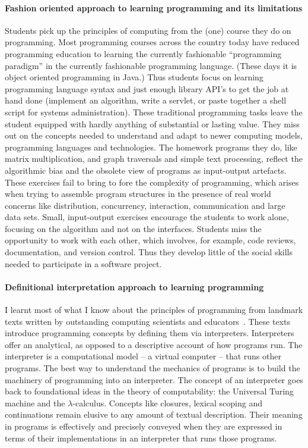 \documentclass[
9pt, 
]{article}
\begin{document}
\paragraph{Fashion oriented approach to learning programming and its limitations}
Students pick up the principles of computing from the (one)
course they do on programming.  Most programming courses
across the country today have reduced programming education
to learning the currently fashionable ``programming
paradigm'' in the currently fashionable programming language.
(These days it is object oriented programming in Java.)
Thus students focus on learning programming language syntax
and just enough library API's to get the job at hand done
(implement an algorithm, write a servlet, or paste together
a shell script for systems administration).  These
traditional programming tasks leave the student equipped
with hardly anything of substantial or lasting value.  They
miss out on the concepts needed to understand and adapt to
newer computing models, programming languages and
technologies.  The homework programs they do, like matrix
multiplication, and graph traversals and simple text
processing, reflect the algorithmic bias and the obsolete
view of programs as input-output artefacts.  These exercises
fail to bring to fore the complexity of programming, which
arises when trying to assemble program structures in the
presence of real world concerns like distribution,
concurrency, interaction, communication and large data sets.
Small, input-output exercises encourage the students to work
alone, focusing on the algorithm and not on the interfaces.
Students miss the opportunity to work with each other, which
involves, for example, code reviews, documentation, and
version control.  Thus they develop little of the social skills
needed to participate in a software project.

\paragraph{Definitional interpretation approach to learning programming}
I learnt most of what I know about the principles of
programming from landmark texts written by outstanding
computing scientists and educators~\cite{sicp,htdp,eopl}.
These texts introduce programming concepts by defining them
via interpreters.  Interpreters offer an analytical, as
opposed to a descriptive account of how programs run.  The
interpreter is a computational model -- a virtual computer
-- that runs other programs.  The best way to understand the
mechanics of programs is to build the machinery of
programming into an interpreter.  The concept of an
interpreter goes back to foundational ideas in the theory of
computability: the Universal Turing machine and the
$\lambda$-calculus.  Concepts like closures, lexical scoping
and continuations remain elusive to any amount of textual
description.  Their meaning in programs is effectively and
precisely conveyed when they are expressed in terms of their
implementations in an interpreter that runs those programs.
\end{document}
